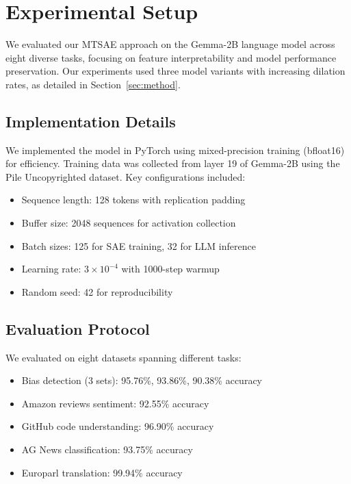 \documentclass{article} %
\begin{document}
\section{Experimental Setup}
\label{sec:experimental}

We evaluated our MTSAE approach on the Gemma-2B language model across eight diverse tasks, focusing on feature interpretability and model performance preservation. Our experiments used three model variants with increasing dilation rates, as detailed in Section~\ref{sec:method}.

\subsection{Implementation Details}
\label{subsec:implementation}
We implemented the model in PyTorch using mixed-precision training (bfloat16) for efficiency. Training data was collected from layer 19 of Gemma-2B using the Pile Uncopyrighted dataset. Key configurations included:

\begin{itemize}
    \item Sequence length: 128 tokens with replication padding
    \item Buffer size: 2048 sequences for activation collection
    \item Batch sizes: 125 for SAE training, 32 for LLM inference
    \item Learning rate: $3\times10^{-4}$ with 1000-step warmup
    \item Random seed: 42 for reproducibility
\end{itemize}

\subsection{Evaluation Protocol}
\label{subsec:evaluation}
We evaluated on eight datasets spanning different tasks:
\begin{itemize}
    \item Bias detection (3 sets): 95.76\%, 93.86\%, 90.38\% accuracy
    \item Amazon reviews sentiment: 92.55\% accuracy
    \item GitHub code understanding: 96.90\% accuracy
    \item AG News classification: 93.75\% accuracy
    \item Europarl translation: 99.94\% accuracy
\end{itemize}
\end{document}
